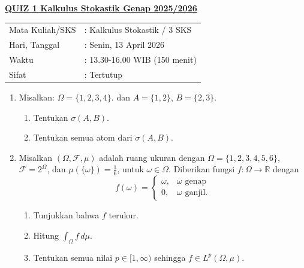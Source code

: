 \documentclass{article}
\begin{document}
\begin{center}
  \textbf{\underline{QUIZ 1 Kalkulus Stokastik Genap 2025/2026}}
  \begin{tabular}{ll}
    Mata Kuliah/SKS & : Kalkulus Stokastik / 3 SKS  \\
    Hari, Tanggal   & : Senin, 13 April 2026        \\
    Waktu           & : 13.30-16.00 WIB (150 menit) \\
    Sifat           & : Tertutup
  \end{tabular}
\end{center}



\begin{enumerate}
  \item Misalkan: $\Omega = \{1, 2, 3, 4\}$. dan $A = \{1, 2\}$, $B = \{2, 3\}$.
        \begin{enumerate}[label=(\alph*)]
          \item Tentukan $\sigma(A, B)$.
          \item Tentukan semua atom dari $\sigma(A, B)$.
        \end{enumerate}

  \item Misalkan $(\Omega, \mathcal{F}, \mu)$ adalah ruang ukuran dengan $\Omega = \{1, 2, 3, 4, 5, 6\}$, $\mathcal{F} = 2^\Omega$, dan $\mu(\{\omega\}) = \frac{1}{6}$, untuk $\omega \in \Omega$. Diberikan fungsi $f : \Omega \to \mathbb{R}$ dengan
        \[
          f(\omega) = \begin{cases}
            \omega, & \omega \text{ genap}   \\
            0,      & \omega \text{ ganjil.}
          \end{cases}
        \]
        \begin{enumerate}[label=(\alph*)]
          \item Tunjukkan bahwa $f$ terukur.
          \item Hitung $\int_\Omega f \, d\mu$.
          \item Tentukan semua nilai $p \in [1, \infty)$ sehingga $f \in L^p(\Omega, \mu)$.
        \end{enumerate}


\end{enumerate}
\end{document}
